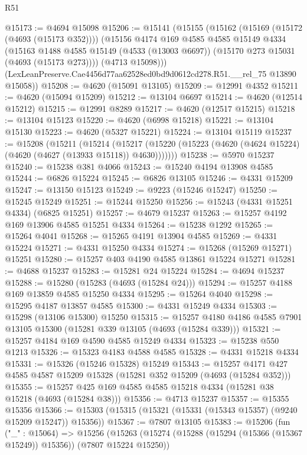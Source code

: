 \begin{lexlean}{R51}
\begin{coremodule}
@15173 := @4694 @15098
@15206 := @15141
    (@15155
      (@15162
        (@15169 (@15172 (@4693 (@15173 @352))))
        (@15156
          @4174
          @169
          @4585
          @4585
          @15149
          @4334
          (@15163
            @1488
            @4585
            @15149
            (@4533 (@13003 @6697))
            (@15170 @273 @15031 (@4693 (@15173 @273))))
          (@4713 @15098)))
      (LexLeanPreserve.Cae4456d77aa62528ed0bd9d0612cd278.R51.__rel_75 @13890 @15058))
@15208 := @4620 (@15091 @13105)
@15209 := @12991 @4352
@15211 := @4620 (@15094 @15209)
@15212 := @13104 @6697
@15214 := @4620 (@12514 @15212)
@15215 := @12991 @8289
@15217 := @4620 (@12517 @15215)
@15218 := @13104 @15123
@15220 := @4620 (@6998 @15218)
@15221 := @13104 @15130
@15223 := @4620 (@5327 @15221)
@15224 := @13104 @15119
@15237 := @15208
    (@15211
      (@15214
        (@15217 (@15220 (@15223 (@4620 (@4624 @15224) (@4620 (@4627 (@13933 @15118)) @4630)))))))
@15238 := @5970 @15237
@15240 := @15238 @381 @4066
@15243 := @15240 @4194 @13908 @4585
@15244 := @6826 @15224
@15245 := @6826 @13105
@15246 := @4331 @15209
@15247 := @13150 @15123
@15249 := @9223 (@15246 @15247)
@15250 := @15245 @15249
@15251 := @15244 @15250
@15256 := @15243 (@4331 @15251 @4334) (@6825 @15251)
@15257 := @4679 @15237
@15263 := @15257 @4192 @169 @13906 @4585 @15251 @4334
@15264 := @15238 @1292
@15265 := @15264 @4041
@15268 := @15265 @4191 @13904 @4585
@15269 := @4331 @15224
@15271 := @4331 @15250 @4334
@15274 := @15268 (@15269 @15271) @15251
@15280 := @15257 @403 @4190 @4585 @13861 @15224 @15271
@15281 := @4688 @15237
@15283 := @15281 @24 @15224
@15284 := @4694 @15237
@15288 := @15280 (@15283 (@4693 (@15284 @24)))
@15294 := @15257 @4188 @169 @13859 @4585 @15250 @4334
@15295 := @15264 @4040
@15298 := @15295 @4187 @13857 @4585
@15300 := @4331 @15249 @4334
@15303 := @15298 (@13106 @15300) @15250
@15315 := @15257 @4180 @4186 @4585 @7901 @13105 @15300 (@15281 @339 @13105 (@4693 (@15284 @339)))
@15321 := @15257 @4184 @169 @4590 @4585 @15249 @4334
@15323 := @15238 @550 @1213
@15326 := @15323 @4183 @4588 @4585
@15328 := @4331 @15218 @4334
@15331 := @15326 (@15246 @15328) @15249
@15343 := @15257 @4171 @427 @4585 @4587 @15209 @15328 (@15281 @352 @15209 (@4693 (@15284 @352)))
@15355 := @15257 @425 @169 @4585 @4585 @15218 @4334 (@15281 @38 @15218 (@4693 (@15284 @38)))
@15356 := @4713 @15237
@15357 := @15355 @15356
@15366 := @15303 (@15315 (@15321 (@15331 (@15343 @15357) (@9240 @15209 @15247)) @15356))
@15367 := @7807 @13105
@15383 := @15206
    (fun ("_" : @15064) =>
    @15256
      (@15263
        (@15274 (@15288 (@15294 (@15366 (@15367 @15249)) @15356)) (@7807 @15224 @15250))

\end{coremodule}
\end{lexlean}

